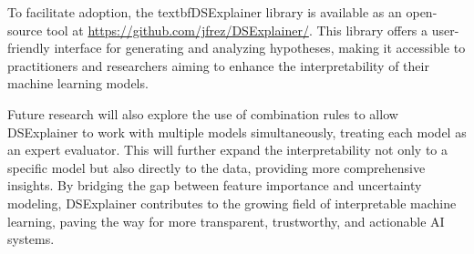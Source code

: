 \documentclass[acmlarge]{acmart}
\begin{document}
To facilitate adoption, the textbf{DSExplainer library} is available as an open-source tool at \url{https://github.com/jfrez/DSExplainer/}. This library offers a user-friendly interface for generating and analyzing hypotheses, making it accessible to practitioners and researchers aiming to enhance the interpretability of their machine learning models.

Future research will also explore the use of combination rules to allow DSExplainer to work with multiple models simultaneously, treating each model as an expert evaluator. This will further expand the interpretability not only to a specific model but also directly to the data, providing more comprehensive insights. By bridging the gap between feature importance and uncertainty modeling, DSExplainer contributes to the growing field of interpretable machine learning, paving the way for more transparent, trustworthy, and actionable AI systems.



\end{document}
